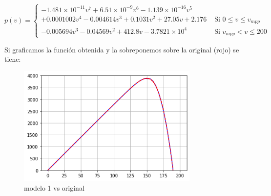 \documentclass[a4paper,12pt]{article}
\begin{document}
	\begin{equation*}
		p\left ( v \right ) = \begin{cases}
			-1.481 \times 10^{-11} v^7 + 6.51\times 10^{-9}v^6 - 1.139\times 10^{-16}v^5 & \\
			+ 0.0001002v^4 - 0.004614v^3  + 0.1031v^2 + 27.05v + 2.176 & \text{ Si } 0 \leq v \leq v_{mpp} \\ 
			-0.005694v^3 - 0.04569v^2 + 412.8v - 3.7821 \times 10^{4} & \text{ Si } v_{mpp} < v \leq 200 
		\end{cases}
	\end{equation*}
	
	Si graficamos la función obtenida y la sobreponemos sobre la original (rojo) se tiene:
	
	\begin{figure}[htb]
		\centering
		\includegraphics[width=0.8\textwidth]{./imagenes/modelo1.png}
		\caption{modelo 1 vs original}
	\end{figure}
\end{document}
